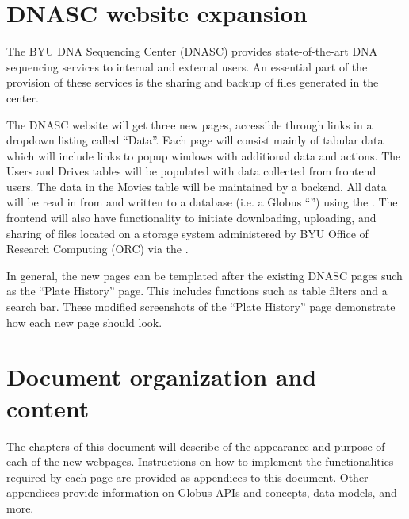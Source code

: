 
\section{DNASC website expansion}

The BYU DNA Sequencing Center (DNASC) provides state-of-the-art DNA sequencing services 
to internal and external users. An essential part of the provision of these services is 
the sharing and backup of files generated in the center.

The DNASC website  will get three new pages, accessible 
through links in a dropdown listing called ``Data''. Each page will consist mainly of 
tabular data which will include links to popup windows with additional data and actions. 
The Users and Drives tables will be populated with data collected from frontend users. 
The data in the Movies table will be maintained by a backend. All data will be read in 
from and written to a database (i.e. a Globus ``'') using the 
. The frontend will also have functionality 
to initiate downloading, uploading, and sharing of files located on a storage system 
administered by BYU Office of Research Computing (ORC) via the .

In general, the new pages can be templated after the existing DNASC pages such as the ``Plate History'' page. This 
includes functions such as table filters and a search bar. 
These modified screenshots of the ``Plate History'' page 
demonstrate how each new page should look.

\section{Document organization and content}

The chapters of this document will describe of the appearance and purpose of each of the
new webpages. Instructions on how to implement the functionalities required by each page
are provided as appendices to this document. Other appendices provide information on
Globus APIs and concepts, data models, and more.
